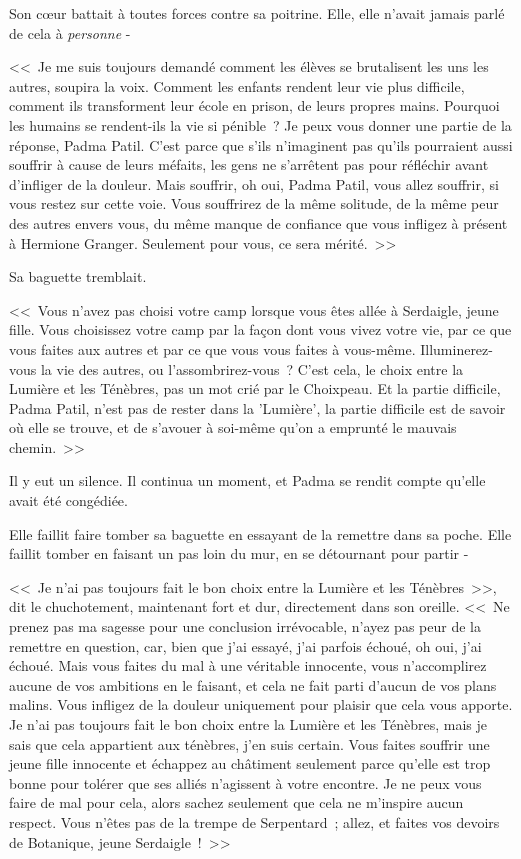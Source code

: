 Son cœur battait à toutes forces contre sa poitrine. Elle, elle n'avait jamais parlé de cela à \emph{personne} -

<<~Je me suis toujours demandé comment les élèves se brutalisent les uns les autres, soupira la voix. Comment les enfants rendent leur vie plus difficile, comment ils transforment leur école en prison, de leurs propres mains. Pourquoi les humains se rendent-ils la vie si pénible~? Je peux vous donner une partie de la réponse, Padma Patil. C'est parce que s'ils n'imaginent pas qu'ils pourraient aussi souffrir à cause de leurs méfaits, les gens ne s'arrêtent pas pour réfléchir avant d'infliger de la douleur. Mais souffrir, oh oui, Padma Patil, vous allez souffrir, si vous restez sur cette voie. Vous souffrirez de la même solitude, de la même peur des autres envers vous, du même manque de confiance que vous infligez à présent à Hermione Granger. Seulement pour vous, ce sera mérité.~>>

Sa baguette tremblait.

<<~Vous n'avez pas choisi votre camp lorsque vous êtes allée à Serdaigle, jeune fille. Vous choisissez votre camp par la façon dont vous vivez votre vie, par ce que vous faites aux autres et par ce que vous vous faites à vous-même. Illuminerez-vous la vie des autres, ou l'assombrirez-vous~? C'est cela, le choix entre la Lumière et les Ténèbres, pas un mot crié par le Choixpeau. Et la partie difficile, Padma Patil, n'est pas de rester dans la 'Lumière', la partie difficile est de savoir où elle se trouve, et de s'avouer à soi-même qu'on a emprunté le mauvais chemin.~>>

Il y eut un silence. Il continua un moment, et Padma se rendit compte qu'elle avait été congédiée.

Elle faillit faire tomber sa baguette en essayant de la remettre dans sa poche. Elle faillit tomber en faisant un pas loin du mur, en se détournant pour partir -

<<~Je n'ai pas toujours fait le bon choix entre la Lumière et les Ténèbres~>>, dit le chuchotement, maintenant fort et dur, directement dans son oreille. <<~Ne prenez pas ma sagesse pour une conclusion irrévocable, n'ayez pas peur de la remettre en question, car, bien que j'ai essayé, j'ai parfois échoué, oh oui, j'ai échoué. Mais vous faites du mal à une véritable innocente, vous n'accomplirez aucune de vos ambitions en le faisant, et cela ne fait parti d'aucun de vos plans malins. Vous infligez de la douleur uniquement pour plaisir que cela vous apporte. Je n'ai pas toujours fait le bon choix entre la Lumière et les Ténèbres, mais je sais que cela appartient aux ténèbres, j'en suis certain. Vous faites souffrir une jeune fille innocente et échappez au châtiment seulement parce qu'elle est trop bonne pour tolérer que ses alliés n'agissent à votre encontre. Je ne peux vous faire de mal pour cela, alors sachez seulement que cela ne m'inspire aucun respect. Vous n'êtes pas de la trempe de Serpentard~; allez, et faites vos devoirs de Botanique, jeune Serdaigle~!~>>

